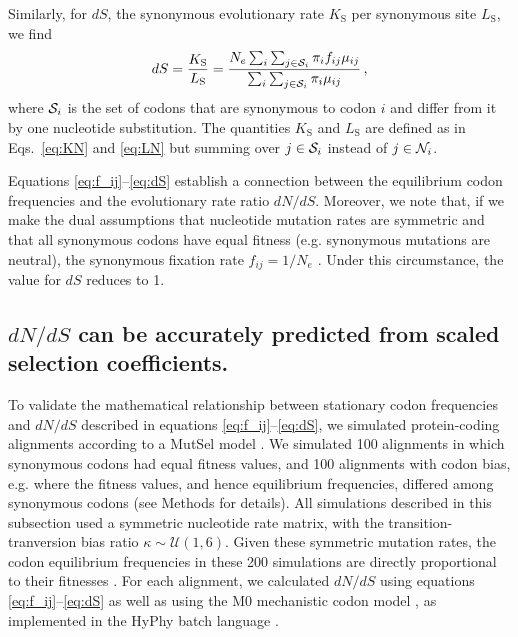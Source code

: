 \documentclass{pnastwo}
\begin{document}
Similarly, for $dS$, the synonymous evolutionary rate $K_\text{S}$ per synonymous site $L_\text{S}$, we find
\begin{equation}\label{eq:dS}
  dS = \frac{K_\text{S}}{L_\text{S}}=\frac{ N_e \sum_i \sum_{j \in {\cal S}_i} \pi_i f_{ij} \mu_{ij} } {\sum_i \sum_{j \in {\cal S}_i} \pi_i \mu_{ij} }\,,
\end{equation}
where ${\cal S}_i$ is the set of codons that are synonymous to codon $i$ and differ from it by one nucleotide substitution. The quantities $K_\text{S}$ and $L_\text{S}$ are defined as in Eqs.~\eqref{eq:KN} and \eqref{eq:LN} but summing over $j\in {\cal S}_i$ instead of $j\in {\cal N}_i$.

Equations \eqref{eq:f_ij}--\eqref{eq:dS} establish a connection between the equilibrium codon frequencies and the evolutionary rate ratio $dN/dS$. Moreover, we note that, if we make the dual assumptions that nucleotide mutation rates are symmetric and that all synonymous codons have equal fitness (e.g. synonymous mutations are neutral), the synonymous fixation rate $f_{ij}= 1/N_e$ \cite{CrowKimura1970}. Under this circumstance, the value for $dS$ reduces to 1.

\subsection*{$dN/dS$ can be accurately predicted from scaled selection coefficients.}

To validate the mathematical relationship between stationary codon frequencies and $dN/dS$ described in equations \eqref{eq:f_ij}--\eqref{eq:dS}, we simulated protein-coding alignments according to a MutSel model \cite{HalpernBruno1998,SellaHirsh2005}. We simulated 100 alignments in which synonymous codons had equal fitness values, and 100 alignments with codon bias, e.g. where the fitness values, and hence equilibrium frequencies, differed among synonymous codons (see Methods for details). All simulations described in this subsection used a symmetric nucleotide rate matrix, with the transition-tranversion bias ratio $\kappa \sim \mathcal{U}(1,6)$. Given these symmetric mutation rates, the codon equilibrium frequencies in these 200 simulations are directly proportional to their fitnesses \cite{SellaHirsh2005}. For each alignment, we calculated $dN/dS$ using equations \eqref{eq:f_ij}--\eqref{eq:dS} as well as using the M0 mechanistic codon model \cite{NielsenYang1998}, as implemented in the HyPhy batch language \cite{KosakovskyPondetal2005}.
\end{document}
